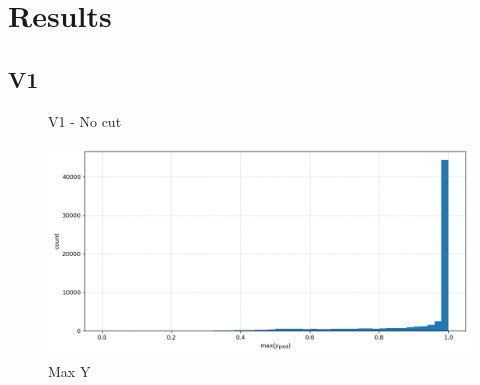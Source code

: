 \chapter{Results}
\label{chap:chapter-4}

\section{V1}

\begin{figure}[h]
    \centering
    \qquad
    \caption{V1 - No cut\label{fig:synth_spectra}}
\end{figure}
\begin{figure}
    \centering
    \includegraphics[width=.4\linewidth]{figures/v1/max_ypred.png}
    \caption{Max Y}
    \label{fig:maxy}
\end{figure}
